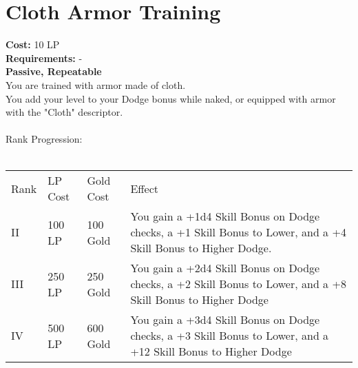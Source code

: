 \section{Cloth Armor Training}\label{perk:clothArmorTraining}
\textbf{Cost:} 10 LP\\
\textbf{Requirements:} -\\
\textbf{Passive, Repeatable}\\
You are trained with armor made of cloth.\\
You add your level to your Dodge bonus while naked, or equipped with armor with the "Cloth" descriptor.\\
\\

Rank Progression:\\
\\
\begin{longtable}{l | l | l | p{9cm}}
	Rank & LP Cost & Gold Cost & Effect\\
	II & 100 LP & 100 Gold & You gain a +1d4 Skill Bonus on Dodge checks, a +1 Skill Bonus to Lower, and a +4 Skill Bonus to Higher Dodge.\\
	III & 250 LP & 250 Gold & You gain a +2d4 Skill Bonus on Dodge checks, a +2 Skill Bonus to Lower, and a +8 Skill Bonus to Higher Dodge\\
	IV & 500 LP & 600 Gold & You gain a +3d4 Skill Bonus on Dodge checks, a +3 Skill Bonus to Lower, and a +12 Skill Bonus to Higher Dodge\\
\end{longtable}